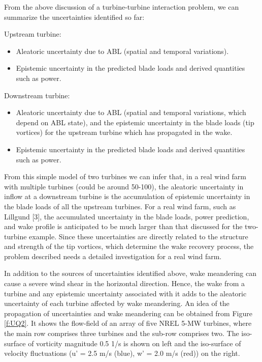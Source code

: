 \documentclass[]{aiaa-tc}%
\begin{document}
From the above discussion of a turbine-turbine interaction problem, we can summarize the uncertainties identified so far:

Upstream turbine: 
\begin{itemize}
  \item Aleatoric uncertainty due to ABL (spatial and temporal variations).
  \item Epistemic uncertainty in the predicted blade loads and derived quantities such as power.
\end{itemize}

Downstream turbine: 
\begin{itemize}
  \item Aleatoric uncertainty due to ABL (spatial and temporal variations, which depend on ABL state), and the epistemic uncertainty in the blade loads (tip vortices) for the upstream turbine which has propagated in the wake.
  \item Epistemic uncertainty in the predicted blade loads and derived quantities such as power.
\end{itemize}

From this simple model of two turbines we can infer that, in a real wind farm with multiple turbines (could be around 50-100), the aleatoric uncertainty in inflow at a downstream turbine is the accumulation of epistemic uncertainty in the blade loads of all the upstream turbines. For a real wind farm, such as Lillgund [3], the accumulated uncertainty in the blade loads, power prediction, and wake profile is anticipated to be much larger than that discussed for the two-turbine example. Since these uncertainties are directly related to the structure and strength of the tip vortices, which determine the wake recovery process, the problem described needs a detailed investigation for a real wind farm.

In addition to the sources of uncertainties identified above, wake meandering can cause a severe wind shear in the horizontal direction. Hence, the wake from a turbine and any epistemic uncertainty associated with it adds to the aleatoric uncertainty of each turbine affected by wake meandering. An idea of the propagation of uncertainties and wake meandering can be obtained from Figure \ref{f:UQ2}. It shows the flow-field of an array of five NREL 5-MW turbines, where the main row comprises three turbines and the sub-row comprises two. The iso-surface of vorticity magnitude 0.5 1/s is shown on left and the iso-surface of velocity fluctuations (u’ = 2.5 m/s (blue), w’ = 2.0 m/s (red)) on the right. 
\end{document}
